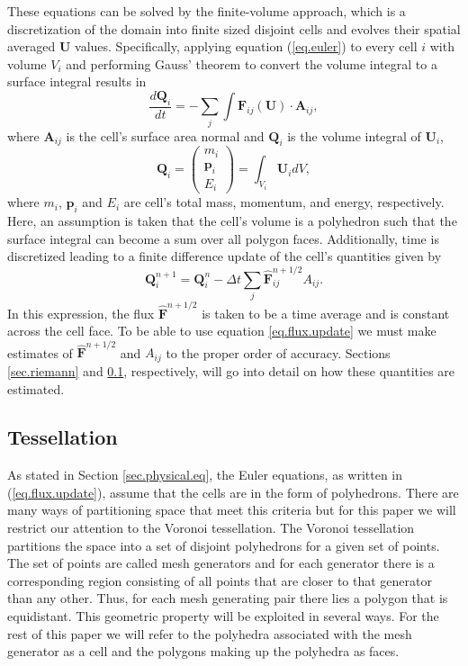 These equations can be solved by the finite-volume approach, which is a
discretization of the domain into finite sized disjoint cells and evolves their
spatial averaged $\mathbf{U}$ values. Specifically, applying equation
(\ref{eq.euler}) to every cell $i$ with volume $V_i$ and performing Gauss'
theorem to convert the volume integral to a surface integral results in
%
\begin{equation}
    \label{eq.euler.int}
    \frac{d\mathbf{Q}_i}{dt} =
    -\sum_{j}\int\mathbf{F}_{ij}(\mathbf{U})\cdot\mathbf{A}_{ij},
\end{equation}
%
where $\mathbf{A}_{ij}$ is the cell's surface area normal and $\mathbf{Q}_i$
is the volume integral of $\mathbf{U}_i$,
%
\begin{equation}
	\mathbf{Q}_i =
    \left(
    \begin{array}{c}
    	m_i \\
        \mathbf{p}_i \\
        E_i
     \end{array}
     \right) = \int_{V_i}\mathbf{U}_i dV,
\end{equation}
where $m_i$, $\mathbf{p}_i$ and $E_i$ are cell's total mass, momentum, and
energy, respectively. Here, an assumption is taken that the cell's volume
is a polyhedron such that the surface integral can become a sum over all
polygon faces. Additionally, time is discretized leading to a finite difference
update of the cell's quantities given by
%
\begin{equation}
    \label{eq.flux.update}
    \mathbf{Q}_i^{n+1} = \mathbf{Q}_i^n - \Delta t\sum_j
    \mathbf{\hat{F}}_{ij}^{n+1/2} A_{ij}.
\end{equation}
%
In this expression, the flux $\mathbf{\hat{F}}^{n+1/2}$ is taken to be a time
average and is constant across the cell face. To be able to use equation
\ref{eq.flux.update} we must make estimates of
$\mathbf{\hat{F}}^{n+1/2}$ and $A_{ij}$ to the proper order of accuracy. Sections \ref{sec.riemann} and
\ref{sec.tessellation}, respectively, will go into detail on how these quantities are
estimated.

\subsection{Tessellation}
\label{sec.tessellation}
As stated in Section \ref{sec.physical.eq}, the Euler equations, as written in
(\ref{eq.flux.update}), assume that the cells are in the form of polyhedrons.
There are many ways of partitioning space that meet this criteria but for this
paper we will restrict our attention to the Voronoi tessellation. The Voronoi
tessellation partitions the space into a set of disjoint polyhedrons for a
given set of points. The set of points are called mesh generators and for each
generator there is a corresponding region consisting of all points that are closer
to that generator than any other. Thus, for each mesh generating pair there
lies a polygon that is equidistant. This geometric property will be exploited
in several ways. For the rest of this paper we will refer to the polyhedra
associated with the mesh generator as a cell and the polygons making up the
polyhedra as faces.

